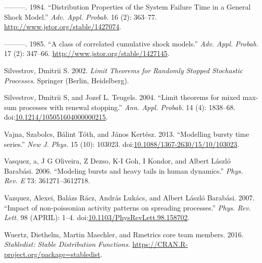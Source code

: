 \documentclass[smallextended]{svjour3}       %
\begin{document}
\hypertarget{ref-Sumita1984}{}
---------. 1984. ``Distribution Properties of the System Failure Time in
a General Shock Model.'' \emph{Adv. Appl. Probab.} 16 (2): 363--77.
\url{http://www.jstor.org/stable/1427074}.

\hypertarget{ref-Sumita1985}{}
---------. 1985. ``A class of correlated cumulative shock models.''
\emph{Adv. Appl. Probab.} 17 (2): 347--66.
\url{http://www.jstor.org/stable/1427145}.

\hypertarget{ref-Silvestrov2002a}{}
Silvestrov, Dmitrii S. 2002. \emph{Limit Theorems for Randomly Stopped
Stochastic Processes}. Springer (Berlin, Heidelberg).

\hypertarget{ref-ST04}{}
Silvestrov, Dmitrii S, and Jozef L. Teugels. 2004. ``Limit theorems for
mixed max-sum processes with renewal stopping.'' \emph{Ann. Appl.
Probab.} 14 (4): 1838--68.
doi:\href{https://doi.org/10.1214/105051604000000215}{10.1214/105051604000000215}.

\hypertarget{ref-Vajna2013}{}
Vajna, Szabolcs, Bálint Tóth, and János Kertész. 2013. ``Modelling
bursty time series.'' \emph{New J. Phys.} 15 (10): 103023.
doi:\href{https://doi.org/10.1088/1367-2630/15/10/103023}{10.1088/1367-2630/15/10/103023}.

\hypertarget{ref-Vasquez2006}{}
Vasquez, a, J G Oliveira, Z Dezso, K-I Goh, I Kondor, and Albert László
Barabási. 2006. ``Modeling bursts and heavy tails in human dynamics.''
\emph{Phys. Rev. E} 73: 361271--3612718.

\hypertarget{ref-Vazquez2007}{}
Vazquez, Alexei, Balázs Rácz, András Lukács, and Albert László Barabási.
2007. ``Impact of non-poissonian activity patterns on spreading
processes.'' \emph{Phys. Rev. Lett.} 98 (APRIL): 1--4.
doi:\href{https://doi.org/10.1103/PhysRevLett.98.158702}{10.1103/PhysRevLett.98.158702}.

\hypertarget{ref-stabledist}{}
Wuertz, Diethelm, Martin Maechler, and Rmetrics core team members. 2016.
\emph{Stabledist: Stable Distribution Functions}.
\url{https://CRAN.R-project.org/package=stabledist}.



\end{document}
